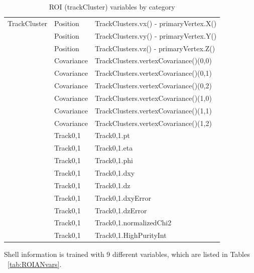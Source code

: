 \begin{table}[htb]
\caption{ROI (trackCluster) variables by category}
\begin{center}
\begin{tabular}{r|l|l}\hline
 TrackCluster & Position & TrackClusters.vx() - primaryVertex.X() \\
              & Position & TrackClusters.vy() - primaryVertex.Y() \\
              & Position & TrackClusters.vz() - primaryVertex.Z() \\
              & Covariance & TrackClusters.vertexCovariance()(0,0) \\
              & Covariance & TrackClusters.vertexCovariance()(0,1) \\
              & Covariance & TrackClusters.vertexCovariance()(0,2) \\
              & Covariance & TrackClusters.vertexCovariance()(1,0) \\
              & Covariance & TrackClusters.vertexCovariance()(1,1) \\
              & Covariance & TrackClusters.vertexCovariance()(1,2) \\
              & Track0,1 & Track0,1.pt \\
              & Track0,1 & Track0,1.eta \\
              & Track0,1 & Track0,1.phi \\
              & Track0,1 & Track0,1.dxy \\
              & Track0,1 & Track0,1.dz \\
              & Track0,1 & Track0,1.dxyError \\
              & Track0,1 & Track0,1.dzError \\
              & Track0,1 & Track0,1.normalizedChi2 \\
              & Track0,1 & Track0,1.HighPurityInt \\
 \hline
 \hline
\end{tabular}
\label{tab:ROITCvars}
\end{center}
\end{table}



Shell information is trained with 9 different variables, which are listed in Tables ~\ref{tab:ROIANvars}.

